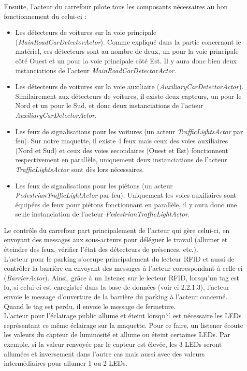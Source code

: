 Ensuite, l’acteur du carrefour pilote tous les composants nécessaires au bon fonctionnement du celui-ci :
\begin{itemize}
\item Les détecteurs de voitures sur la voie principale (\emph{MainRoadCarDetectorActor}). Comme expliqué dans la partie concernant le matériel, ces détecteurs sont au nombre de deux, un pour la voie principale côté Ouest et un pour la voie principale côté Est. Il y aura donc bien deux instanciations de l’acteur \emph{MainRoadCarDetectorActor}.
\item Les détecteurs de voitures sur la voie auxiliaire (\emph{AuxiliaryCarDetectorActor}). Similairement aux détecteurs de voitures, il existe deux capteurs, un pour le Nord et un pour le Sud, et donc deux instanciations de l’acteur \emph{AuxiliaryCarDetectorActor}.
\item Les feux de signalisations pour les voitures (un acteur \emph{TrafficLightsActor} par feu). Sur notre maquette, il existe 4 feux mais ceux des voies auxiliaires (Nord et Sud) et ceux des voies secondaires (Ouest et Est) fonctionnent respectivement en parallèle, uniquement deux instanciations de l’acteur \emph{TrafficLightsActor} sont dès lors nécessaires.
\item Les feux de signalisations pour les piétons (un acteur \emph{PedestrianTrafficLightActor} par feu). Uniquement les voies auxiliaires sont équipées de feux pour piétons fonctionnant en parallèle, il y aura donc une seule instanciation de l’acteur \emph{PedestrianTrafficLightActor}.
\end{itemize}

Le contrôle du carrefour part principalement de l’acteur qui gère celui-ci, en envoyant des messages aux sous-acteurs pour déléguer le travail (allumer et éteindre des feux, vérifier l’état des détecteurs de présences, etc.).\\

L’acteur pour le parking s’occupe principalement du lecteur RFID et aussi de contrôler la barrière en envoyant des messages à l’acteur correspondant à celle-ci (\emph{BarrierActor}). Ainsi, grâce à un listener sur le lecteur RFID, lorsqu’un tag est lu, si celui-ci est enregistré dans la base de données (voir ci 2.2.1.3), l’acteur envoie le message d’ouverture de la barrière du parking à l’acteur concerné. Quand le tag est perdu, il envoie le message de fermeture.\\

L’acteur pour l’éclairage public allume et éteint lorsqu’il est nécessaire les LEDs représentant ce même éclairage sur la maquette. Pour ce faire, un listener écoute les valeurs du capteur de luminosité et allume ou éteint certaines LEDs. Par exemple, si la valeur renvoyée par le capteur est élevée, les 3 LEDs seront allumées et inversement dans l’autre cas mais aussi avec des valeurs intermédiaires pour allumer 1 ou 2 LEDs.\\


